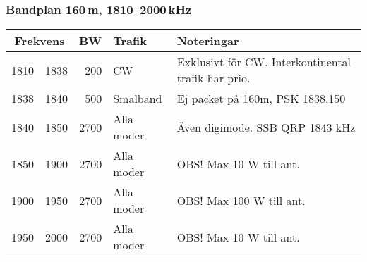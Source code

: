 \subsubsection{Bandplan 160\,m, 1810--2000\,kHz}
\begin{tabular}{rrrll}
\multicolumn{2}{c}{\textbf{Frekvens}} & \textbf{BW} & \textbf{Trafik} & \textbf{Noteringar} \\ \hline
1810 & 1838 & 200  & CW         & Exklusivt för CW. Interkontinental trafik har prio. \\ \hline
1838 & 1840 & 500  & Smalband   & Ej packet på 160m, PSK 1838,150                    \\ \hline
1840 & 1850 & 2700 & Alla moder & Även digimode. SSB QRP 1843 kHz                    \\ \hline
1850 & 1900 & 2700 & Alla moder & OBS! Max 10 W till ant.                             \\ \hline
1900 & 1950 & 2700 & Alla moder & OBS! Max 100 W till ant.                            \\ \hline
1950 & 2000 & 2700 & Alla moder & OBS! Max 10 W till ant.                             \\ \hline
\end{tabular}

